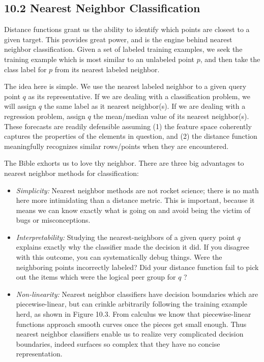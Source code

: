 \documentclass[10pt]{article}
\begin{document}
\subsection*{10.2 Nearest Neighbor Classification}
Distance functions grant us the ability to identify which points are closest to a given target. This provides great power, and is the engine behind nearest neighbor classification. Given a set of labeled training examples, we seek the training example which is most similar to an unlabeled point $p$, and then take the class label for $p$ from its nearest labeled neighbor.

The idea here is simple. We use the nearest labeled neighbor to a given query point $q$ as its representative. If we are dealing with a classification problem, we will assign $q$ the same label as it nearest neighbor(s). If we are dealing with a regression problem, assign $q$ the mean/median value of its nearest neighbor(s). These forecasts are readily defensible assuming (1) the feature space coherently captures the properties of the elements in question, and (2) the distance function meaningfully recognizes similar rows/points when they are encountered.

The Bible exhorts us to love thy neighbor. There are three big advantages to nearest neighbor methods for classification:
\begin{itemize}
    \item \textit{Simplicity:} Nearest neighbor methods are not rocket science; there is no math here more intimidating than a distance metric. This is important, because it means we can know exactly what is going on and avoid being the victim of bugs or misconceptions.
    \item \textit{Interpretability:} Studying the nearest-neighbors of a given query point $q$ explains exactly why the classifier made the decision it did. If you disagree with this outcome, you can systematically debug things. Were the neighboring points incorrectly labeled? Did your distance function fail to pick out the items which were the logical peer group for $q$ ?
    \item \textit{Non-linearity:} Nearest neighbor classifiers have decision boundaries which are piecewise-linear, but can crinkle arbitrarily following the training example herd, as shown in Figure 10.3. From calculus we know that piecewise-linear functions approach smooth curves once the pieces get small enough. Thus nearest neighbor classifiers enable us to realize very complicated decision boundaries, indeed surfaces so complex that they have no concise representation.
\end{itemize}
\end{document}
